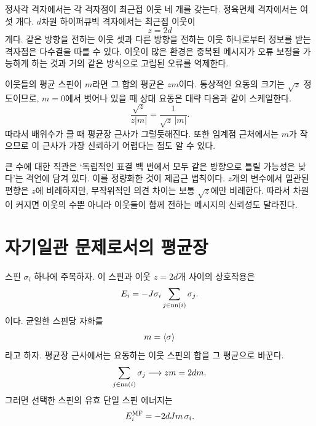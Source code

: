 정사각 격자에서는 각 격자점이 최근접 이웃 네 개를 갖는다. 정육면체 격자에서는 여섯 개다. \(d\)차원 하이퍼큐빅 격자에서는 최근접 이웃이
\begin{equation}
z=2d
\end{equation}
개다. 같은 방향을 전하는 이웃 셋과 다른 방향을 전하는 이웃 하나로부터 정보를 받는 격자점은 다수결을 따를 수 있다. 이웃이 많은 환경은 중복된 메시지가 오류 보정을 가능하게 하는 것과 거의 같은 방식으로 고립된 오류를 억제한다.

이웃들의 평균 스핀이 \(m\)라면 그 합의 평균은 \(zm\)이다. 통상적인 요동의 크기는 \(\sqrt{z}\) 정도이므로, \(m=0\)에서 벗어나 있을 때 상대 요동은 대략 다음과 같이 스케일한다.
\begin{equation}
\frac{\sqrt{z}}{z|m|}
=\frac{1}{\sqrt{z}\,|m|}.
\end{equation}
따라서 배위수가 클 때 평균장 근사가 그럴듯해진다. 또한 임계점 근처에서는 \(m\)가 작으므로 이 근사가 가장 신뢰하기 어렵다는 점도 알 수 있다.

큰 수에 대한 직관은 ‘독립적인 표결 백 번에서 모두 같은 방향으로 틀릴 가능성은 낮다’는 격언에 담겨 있다. 이를 정량화한 것이 제곱근 법칙이다. \(z\)개의 변수에서 일관된 편향은 \(z\)에 비례하지만, 무작위적인 의견 차이는 보통 \(\sqrt{z}\)에만 비례한다. 따라서 차원이 커지면 이웃의 수뿐 아니라 이웃들이 함께 전하는 메시지의 신뢰성도 달라진다.

\begin{classroomqa}
\end{classroomqa}

\section{자기일관 문제로서의 평균장}

스핀 \(\sigma_i\) 하나에 주목하자. 이 스핀과 이웃 \(z=2d\)개 사이의 상호작용은
\begin{equation}
E_i=-J\sigma_i\sum_{j\in{\rm nn}(i)}\sigma_j.
\label{eq:local-energy}
\end{equation}
이다. 균일한 스핀당 자화를
\begin{equation}
m=\left\langle\sigma\right\rangle
\end{equation}
라고 하자. 평균장 근사에서는 요동하는 이웃 스핀의 합을 그 평균으로 바꾼다.
\begin{equation}
\sum_{j\in{\rm nn}(i)}\sigma_j
\longrightarrow zm=2dm.
\end{equation}
그러면 선택한 스핀의 유효 단일 스핀 에너지는
\begin{equation}
E_i^{\rm MF}=-2dJm\,\sigma_i.
\label{eq:mean-field-energy}
\end{equation}

